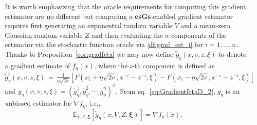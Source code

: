 \documentclass[11pt,reqno]{amsart}
\newcommand{\1}{{\bf 1}}
\newcommand{\2}{{\bf 2}}
\newcommand{\pc}[1]{{\color{cyan}#1}}
\newcommand{\bxi}{\boldsymbol{\xi}}
\numberwithin{equation}{section}
\newtheorem{assumption}{Assumption}[section]
\theoremstyle{remark}
\newtheorem{remark}{Remark}[section]
\begin{document}
{				\medskip
				{It is worth emphasizing that the oracle requirements for computing this gradient estimator  are no different but computing  a {\bf esGs}-enabled gradient estimator requires first generating an exponential random variable $V$ and a mean-zero Gaussian random variable $Z$ and then evaluating the $n$ components of the estimator via the stochastic function oracle via  \eqref{df:grad_est_i} for $i=1, \hdots, n.$ }
				Thanks to Proposition~\ref{cor:gradfeta} we may now define $\tilde{g}_{\eta}(x,v, z,\xi)$ to denote a gradient estimate of $f_{\eta}(x)$, where the $i$-th component is defined as
				\begin{equation} \label{df:grad_est_i}
					\tilde{g}_{\eta}^i(x,v,z,\xi)\, = \, \tfrac{1}{\eta\sqrt{2\pi}}\left[F\left(x_i+\eta\sqrt{2v},x^{-i}-z^{-i},\xi\right)-F\left(x_i-\eta\sqrt{2v},x^{-i}-z^{-i},\xi\right)\right]
				\end{equation}
				and {$\tilde{g}_{\eta}(x,v,z,\xi)=(\tilde{g}_{\eta}^1,\tilde{g}_{\eta}^2,\cdots,\tilde{g}_{\eta}^n)^T$}. From eq.~\eqref{eq:GradientfetaD_2}, ${g}_\eta$ is an unbiased estimator for $\nabla f_\eta$, i.e.,  
				\begin{equation}\label{eq:tilde-g-unbiased}
					\mathbb{E}_{V,Z,\bxi}\left[\tilde{g}_\eta(x,V,Z,\bxi)\right]=\nabla f_\eta (x).
				\end{equation}
		
}
\end{document}
